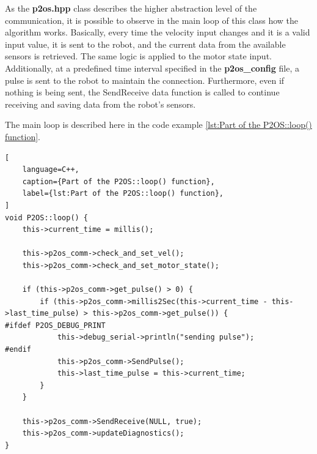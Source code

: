 \documentclass[../../monografia.tex]{subfiles}
\begin{document}
As the \textbf{p2os.hpp} class describes the higher abstraction level of the communication, it is possible to observe in the main loop of this class how the algorithm works. Basically, every time the velocity input changes and it is a valid input value, it is sent to the robot, and the current data from the available sensors is retrieved. The same logic is applied to the motor state input. Additionally, at a predefined time interval specified in the \textbf{p2os\_config} file, a pulse is sent to the robot to maintain the connection. Furthermore, even if nothing is being sent, the SendReceive data function is called to continue receiving and saving data from the robot's sensors.

The main loop is described here in the code example \ref{lst:Part of the P2OS::loop() function}.

\begin{lstlisting}[
    language=C++,
    caption={Part of the P2OS::loop() function},
    label={lst:Part of the P2OS::loop() function},
]
void P2OS::loop() {
    this->current_time = millis();

    this->p2os_comm->check_and_set_vel();
    this->p2os_comm->check_and_set_motor_state();

    if (this->p2os_comm->get_pulse() > 0) {
        if (this->p2os_comm->millis2Sec(this->current_time - this->last_time_pulse) > this->p2os_comm->get_pulse()) {
#ifdef P2OS_DEBUG_PRINT
            this->debug_serial->println("sending pulse");
#endif
            this->p2os_comm->SendPulse();
            this->last_time_pulse = this->current_time;
        }
    }

    this->p2os_comm->SendReceive(NULL, true);
    this->p2os_comm->updateDiagnostics();
}
\end{lstlisting}


\end{document}
